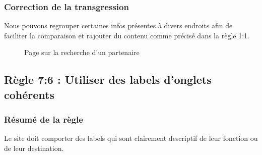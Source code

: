 \documentclass{article}[12pt]
\begin{document}
\newpage
    \subsubsection*{Correction de la transgression}
    Nous pouvons regrouper certaines infos présentes à divers endroits afin de faciliter la comparaison et rajouter du contenu comme précisé dans la règle 1:1.
    \begin{figure}[H]
    	\centering
        \caption{Page sur la recherche d'un partenaire}
    \end{figure}
    
     \subsection{Règle 7:6 : Utiliser des labels d'onglets cohérents}
     \label{label_coherent}
    \subsubsection*{Résumé de la règle}
   Le site doit comporter des labels qui sont clairement descriptif de leur fonction ou de leur destination.
\end{document}
